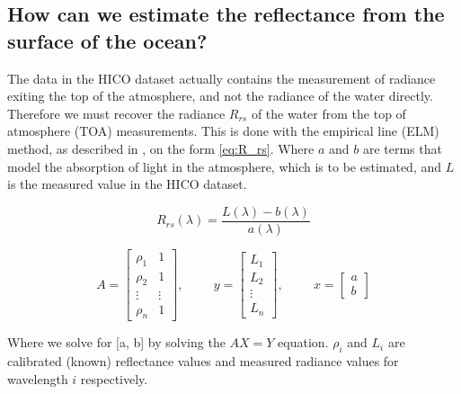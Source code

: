 \subsection{How can we estimate the reflectance from the surface of the ocean?}
\label{sec:atmoshperic_cor}

The data in the HICO dataset actually contains the measurement of radiance exiting the top 
of the atmosphere, and not the radiance of the water directly. Therefore we must recover the 
radiance $R_{rs}$ of the water from the top of atmosphere (TOA) measurements. This is done with 
the empirical line (ELM) method, as described in \cite{assignment}, on the form \cref{eq:R_rs}. 
Where $a$ and $b$ are terms that model the absorption of light in the atmosphere, which is to 
be estimated, and $L$ is the measured value in the HICO dataset. 

\begin{equation}
    \label{eq:R_rs}
    R_{rs}(\lambda) = \frac{L(\lambda) - b(\lambda)}{a(\lambda)}
\end{equation}

\begin{equation}
	\label{eq:task2c_ELM_system}
	A = 
	\begin{bmatrix}
		\rho_1 & 1 \\
		\rho_2 & 1 \\
		\vdots &\vdots \\
		\rho_n & 1
	\end{bmatrix}, \hspace{1cm}
	y = \begin{bmatrix}
		L_1 \\
        L_2 \\
        \vdots \\
		L_n
	\end{bmatrix}, \hspace{1cm}
	x =	\begin{bmatrix}
		a \\
		b
	\end{bmatrix}
\end{equation}

Where we solve for [a, b] by solving the $AX = Y$ equation. $\rho_i$ and $L_i$ 
are calibrated (known) reflectance values and measured radiance values 
for wavelength $i$ respectively. 

